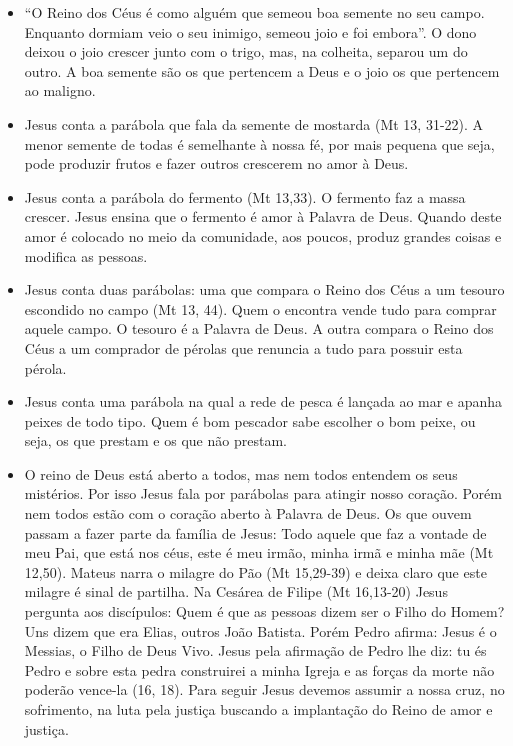 \documentclass[
]{book}
\begin{document}
\begin{itemize}
\item
  ``O Reino dos Céus é como alguém que semeou boa semente no seu campo. Enquanto dormiam veio o seu inimigo, semeou joio e foi embora''. O dono deixou o joio crescer junto com o trigo, mas, na colheita, separou um do outro. A boa semente são os que pertencem a Deus e o joio os que pertencem ao maligno.
\item
  Jesus conta a parábola que fala da semente de mostarda (Mt 13, 31-22). A menor semente de todas é semelhante à nossa fé, por mais pequena que seja, pode produzir frutos e fazer outros crescerem no amor à Deus.
\item
  Jesus conta a parábola do fermento (Mt 13,33). O fermento faz a massa crescer. Jesus ensina que o fermento é amor à Palavra de Deus. Quando deste amor é colocado no meio da comunidade, aos poucos, produz grandes coisas e modifica as pessoas.
\item
  Jesus conta duas parábolas: uma que compara o Reino dos Céus a um tesouro escondido no campo (Mt 13, 44). Quem o encontra vende tudo para comprar aquele campo. O tesouro é a Palavra de Deus. A outra compara o Reino dos Céus a um comprador de pérolas que renuncia a tudo para possuir esta pérola.
\item
  Jesus conta uma parábola na qual a rede de pesca é lançada ao mar e apanha peixes de todo tipo. Quem é bom pescador sabe escolher o bom peixe, ou seja, os que prestam e os que não prestam.
\item
  O reino de Deus está aberto a todos, mas nem todos entendem os seus mistérios. Por isso Jesus fala por parábolas para atingir nosso coração. Porém nem todos estão com o coração aberto à Palavra de Deus. Os que ouvem passam a fazer parte da família de Jesus: Todo aquele que faz a vontade de meu Pai, que está nos céus, este é meu irmão, minha irmã e minha mãe (Mt 12,50). Mateus narra o milagre do Pão (Mt 15,29-39) e deixa claro que este milagre é sinal de partilha. Na Cesárea de Filipe (Mt 16,13-20) Jesus pergunta aos discípulos: Quem é que as pessoas dizem ser o Filho do Homem? Uns dizem que era Elias, outros João Batista. Porém Pedro afirma: Jesus é o Messias, o Filho de Deus Vivo. Jesus pela afirmação de Pedro lhe diz: tu és Pedro e sobre esta pedra construirei a minha Igreja e as forças da morte não poderão vence-la (16, 18).
  Para seguir Jesus devemos assumir a nossa cruz, no sofrimento, na luta pela justiça buscando a implantação do Reino de amor e justiça.
\end{itemize}
\end{document}

